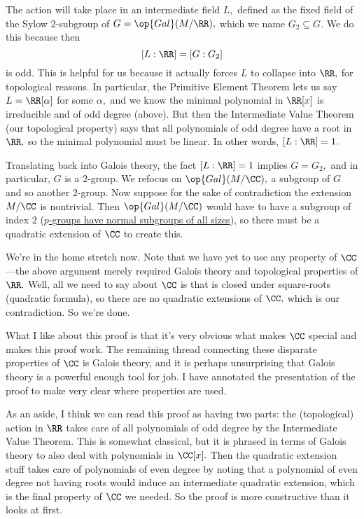The action will take place in an intermediate field $L,$ defined as the fixed field of the Sylow $2$-subgroup of $G=\op{Gal}(M/\RR),$ which we name $G_2\subseteq G.$ We do this because then
\[[L:\RR]=[G:G_2]\]
is odd. This is helpful for us because it actually forces $L$ to collapse into $\RR,$ for  topological reasons. In particular, the Primitive Element Theorem lets us say $L=\RR[\alpha]$ for some $\alpha,$ and we know the minimal polynomial in $\RR[x]$ is irreducible and of odd degree (above). But then the Intermediate Value Theorem (our topological property) says that all polynomials of odd degree have a root in $\RR,$ so the minimal polynomial must be linear. In other words, $[L:\RR]=1.$

Translating back into Galois theory, the fact $[L:\RR]=1$ implies $G=G_2,$ and in particular, $G$ is a $2$-group. We refocus on $\op{Gal}(M/\CC),$ a subgroup of $G$ and so another $2$-group. Now suppose for the sake of contradiction the extension $M/\CC$ is nontrivial. Then $\op{Gal}(M/\CC)$ would have to have a subgroup of index $2$ (\href{https://math.stackexchange.com/questions/1788345/p-groups-have-normal-subgroups-of-each-order?noredirect=1&lq=1}{$p$-groups have normal subgroups of all sizes}), so there must be a quadratic extension of $\CC$ to create this.

We're in the home stretch now. Note that we have yet to use any property of $\CC$---the above argument merely required Galois theory and topological properties of $\RR.$ Well, all we need to say about $\CC$ is that is closed under square-roots (quadratic formula), so there are no quadratic extensions of $\CC,$ which is our contradiction. So we're done.

What I like about this proof is that it's very obvious what makes $\CC$ special and makes this proof work. The remaining thread connecting these disparate properties of $\CC$ is Galois theory, and it is perhaps unsurprising that Galois theory is a powerful enough tool for job. I have annotated the presentation of the proof to make very clear where properties are used.

As an aside, I think we can read this proof as having two parts: the (topological) action in $\RR$ takes care of all polynomials of odd degree by the Intermediate Value Theorem. This is somewhat classical, but it is phrased in terms of Galois theory to also deal with polynomials in $\CC[x].$ Then the quadratic extension stuff takes care of polynomials of even degree by noting that a polynomial of even degree not having roots would induce an intermediate quadratic extension, which is the final property of $\CC$ we needed. So the proof is more constructive than it looks at first.

